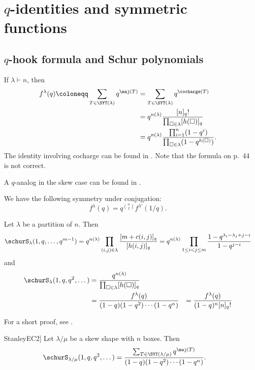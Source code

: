 \section[prelimQKostka]{$q$-identities and symmetric functions}

\subsection[prelimQHook]{$q$-hook formula and Schur polynomials}

\begin{theorem}

If $\lambda \vdash n$, then
\begin{align*}
f^\lambda(q) \coloneqq \sum_{T \in \SYT(\lambda)} q^{\maj(T)} &=\sum_{T \in \SYT(\lambda)} q^{\cocharge(T)} \\
&=q^{n(\lambda)} \frac{[n]_q!}{\prod_{\square \in \lambda} [h(\square)]_q} \\
&=q^{n(\lambda)} \frac{\prod_{i=1}^n (1-q^i)}{\prod_{\square \in \lambda} (1-q^{h(\square)})}.
\end{align*}
The identity involving cocharge can be found in \cite[p.~199]{Bergeron2009}.
Note that the formula on p.~44 is not correct.

A $q$-analog in the skew case can be found in \cite[Prop. 3.3]{MoralesPakPanova2018}.
\end{theorem}

We have the following symmetry under conjugation:
\[
f^{\lambda}(q) = q^{\binom{n}{2}} f^{\lambda'}(1/q).
\]



\begin{theorem}
Let $\lambda$ be a partition of $n$. Then
\[
\schurS_\lambda(1,q,\dotsc,q^{m-1})=
q^{n(\lambda)} \prod_{(i,j) \in \lambda} \frac{[m+c(i,j)]_q}{ [h(i,j)]_q}
=
q^{n(\lambda)} \prod_{1 \leq i < j \leq m } \frac{1-q^{\lambda_i-\lambda_j +j-i}}{1-q^{j-i}}
\]
and
\begin{align*}
\schurS_\lambda(1,q,q^2,\dotsc) &= \frac{q^{n(\lambda)}}{ \prod_{\square \in \lambda} [h(\square)]_q } \\
 &= \frac{f^\lambda(q)}{(1-q)(1-q^2) \dotsm (1-q^{n})}
 &= \frac{f^\lambda(q)}{(1-q)^n [n]_q!}
\end{align*}
\end{theorem}
For a short proof, see \cite{BandlowDAdderio2009}.



\begin{theorem}[From \cite[p. 363]{StanleyEC2}]
Let $\lambda/\mu$ be a skew shape with $n$ boxes. Then
\begin{align*}
\schurS_{\lambda/\mu}(1,q,q^2,\dotsc)  &=
\frac{ \sum_{T \in \SYT(\lambda/\mu)} q^{\maj(T)} }{(1-q)(1-q^2) \dotsm (1-q^{n})}.
\end{align*}
\end{theorem}



